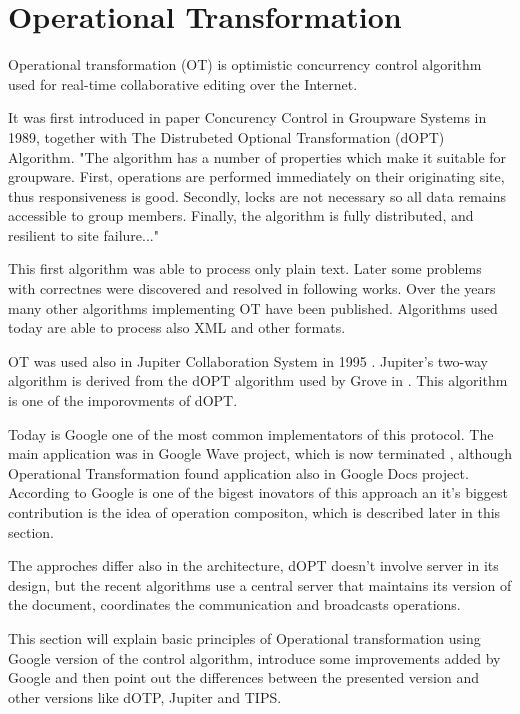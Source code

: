 \documentclass[12pt,oneside]{fithesis2}
\begin{document}
\section{Operational Transformation}
\par Operational transformation (OT) is optimistic concurrency control algorithm used for real-time collaborative editing over the Internet. 
\par It was first introduced in paper Concurency Control in Groupware Systems \cite{Ellis} in 1989, together with The Distrubeted Optional Transformation (dOPT) Algorithm. "The algorithm has a number of properties which make it suitable for groupware. First, operations are performed immediately on their originating site, thus responsiveness is good. Secondly, locks are not necessary so all data remains accessible to group members. Finally, the algorithm is fully distributed, and resilient to site failure..."\cite{Ellis} \par This first algorithm was able to process only plain text. Later some problems with correctnes were discovered and resolved in following works. Over the years many other algorithms implementing OT have been published. Algorithms used today are able to process also XML and other formats. \par OT was used also in Jupiter Collaboration System in 1995 \cite{Jupiter}. Jupiter's two-way algorithm is derived from the dOPT algorithm used by Grove in \cite{Ellis}. This algorithm is one of the imporovments of dOPT. \par Today is Google one of the most common implementators of this protocol. The main application was in Google Wave project, which is now terminated , although Operational Transformation found application also in Google Docs project. According to \cite{Spiewak} Google is one of the bigest inovators of this approach an it's biggest contribution is the idea of operation compositon, which is described later in this section. \par The approches differ also in the architecture, dOPT doesn't involve server in its design, but the recent algorithms use a central server that maintains its version of the document, coordinates the communication and broadcasts operations.
\par This section will explain basic principles of Operational transformation using Google version of the control algorithm, introduce some improvements added by Google and then point out the differences between the presented version and other versions like dOTP, Jupiter and TIPS. 
\end{document}
